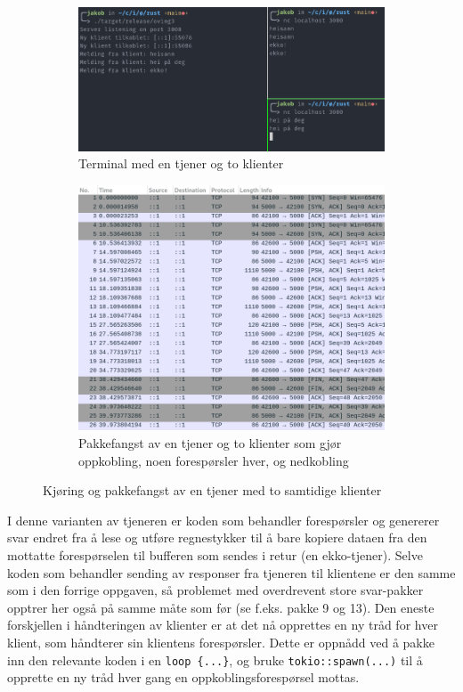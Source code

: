 \documentclass{article}
\newcommand{\code}[1]{\colorbox{light-gray}{\texttt{#1}}}
\begin{document}
\begin{figure}[h]
    \begin{subfigure}{.48\linewidth}
        \includegraphics[width=\linewidth]{illustrasjoner/P3-flere-terminal.png}
        \caption{Terminal med en tjener og to klienter}
    \end{subfigure}
    \hfill
    \begin{subfigure}{.48\linewidth}
        \includegraphics[width=\linewidth]{illustrasjoner/P3-flere-capture.png}
        \caption{Pakkefangst av en tjener og to klienter som gjør oppkobling, noen forespørsler hver, og nedkobling}
    \end{subfigure}
    \caption{Kjøring og pakkefangst av en tjener med to samtidige klienter}
\end{figure}

I denne varianten av tjeneren er koden som behandler forespørsler og genererer svar endret fra å lese og utføre regnestykker til å bare kopiere dataen fra den mottatte forespørselen til bufferen som sendes i retur (en ekko-tjener). Selve koden som behandler sending av responser fra tjeneren til klientene er den samme som i den forrige oppgaven, så problemet med overdrevent store svar-pakker opptrer her også på samme måte som før (se f.eks. pakke 9 og 13). Den eneste forskjellen i håndteringen av klienter er at det nå opprettes en ny tråd for hver klient, som håndterer sin klientens forespørsler. Dette er oppnådd ved å pakke inn den relevante koden i en \code{loop \{...\}}, og bruke \code{tokio::spawn(...)} til å opprette en ny tråd hver gang en oppkoblingsforespørsel mottas.
\end{document}
